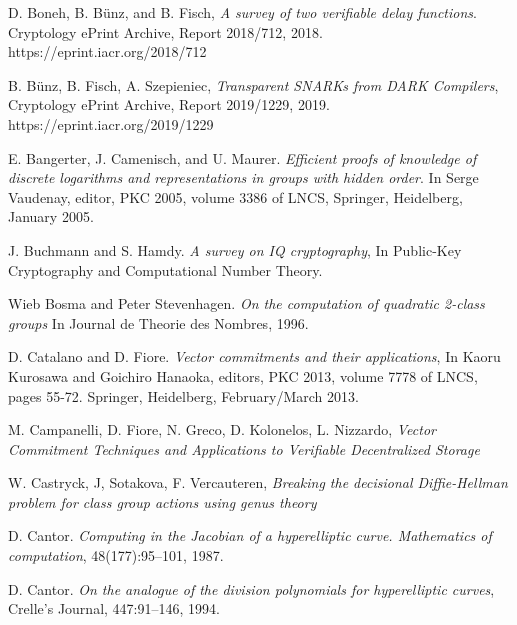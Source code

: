 \documentclass[11pt, lettersize, notitlepage, leqno, footskip=0.6cm]{article}
\newcommand{\noin}{\noindent}
\numberwithin{equation}{section}
\begin{document}
\noin [BBF18] D. Boneh, B. B\"{u}nz, and B. Fisch, \textit{A survey of two verifiable delay functions}. Cryptology ePrint Archive, Report 2018/712, 2018. https://eprint.iacr.org/2018/712 \vspace{0.1cm}

\noindent [BFS19] B. B\"{u}nz, B. Fisch, A. Szepieniec, \textit{Transparent SNARKs from DARK Compilers}, Cryptology ePrint Archive, Report 2019/1229, 2019. https://eprint.iacr.org/2019/1229 \vspace{0.1cm}

\noin [BCM05] E. Bangerter, J. Camenisch, and U. Maurer. \textit{Efficient proofs of knowledge of discrete logarithms and representations in groups with hidden order}. In Serge Vaudenay, editor, PKC 2005, volume 3386 of LNCS, Springer, Heidelberg, January 2005.\vspace{0.1cm}

\noin [BH01] J. Buchmann and S. Hamdy. \textit{A survey on IQ cryptography}, In Public-Key Cryptography and Computational Number Theory. \vspace{0.1cm}

\noin [BS96] Wieb Bosma and Peter Stevenhagen. \textit{On the computation of quadratic 2-class groups} In Journal de Theorie des Nombres, 1996. \vspace{0.1cm}

\noin [CF13] D. Catalano and D. Fiore. \textit{Vector commitments and their applications}, In Kaoru Kurosawa and Goichiro Hanaoka, editors, PKC 2013, volume 7778 of LNCS, pages 55-72. Springer, Heidelberg, February/March 2013.

\noindent [CFGKN20] M. Campanelli, D. Fiore, N. Greco, D. Kolonelos, L. Nizzardo, \textit{Vector Commitment Techniques and Applications to Verifiable Decentralized Storage} \vspace{0.1cm}

\noin [CSV20] W. Castryck, J, Sotakova, F. Vercauteren, \textit{Breaking the decisional Diffie-Hellman problem for class group actions using genus theory}\vspace{0.1cm}

\noindent [Can87] D. Cantor. \textit{Computing in the Jacobian of a hyperelliptic curve. Mathematics of computation}, 48(177):95–101, 1987.\vspace{0.1cm}

\noindent [Can94] D. Cantor. \textit{On the analogue of the division polynomials for hyperelliptic curves}, Crelle's Journal, 447:91–146, 1994.\vspace{0.1cm}
\end{document}
